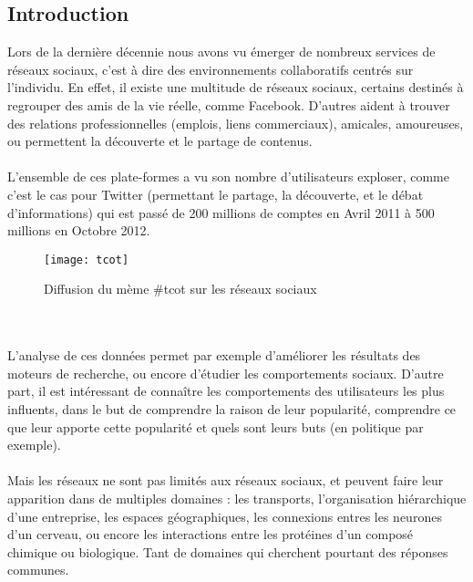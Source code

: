\begin{titlepage}

\newpage
\begin{center}
\begin{bf}
\section{Introduction}
\end{bf}
\end{center}

\vspace{1cm}
{
Lors de la dernière décennie nous avons vu émerger de nombreux services de réseaux sociaux, c'est à dire des environnements collaboratifs centrés sur l'individu. En effet, il existe une multitude de réseaux sociaux, certains destinés à regrouper des amis de la vie réelle, comme Facebook. D'autres aident à trouver des relations professionnelles (emplois, liens commerciaux), amicales, amoureuses, ou permettent la découverte et le partage de contenus.
\\ \\
L'ensemble de ces plate-formes a vu son nombre d'utilisateurs exploser, comme c'est le cas pour Twitter (permettant le partage, la découverte, et le débat d'informations) qui est passé de 200 millions de comptes en Avril 2011 à 500 millions en Octobre 2012.
\begin{figure}[h]
\centering
\texttt{[image: tcot]}
\caption{Diffusion du mème \#tcot sur les réseaux sociaux}
\end{figure}
\\ \\
L'analyse de ces données permet par exemple d'améliorer les résultats des moteurs de recherche, ou encore d'étudier les comportements sociaux. D'autre part, il est intéressant de connaître les comportements des utilisateurs les plus influents, dans le but de comprendre la raison de leur popularité, comprendre ce que leur apporte cette popularité et quels sont leurs buts (en politique par exemple).
\\ \\
Mais les réseaux ne sont pas limités aux réseaux sociaux, et peuvent faire leur apparition dans de multiples domaines : les transports, l'organisation hiérarchique d'une entreprise, les espaces géographiques, les connexions entres les neurones d'un cerveau, ou encore les interactions entre les protéines d'un composé chimique ou biologique. Tant de domaines qui cherchent pourtant des réponses communes.
}
\end{titlepage}
